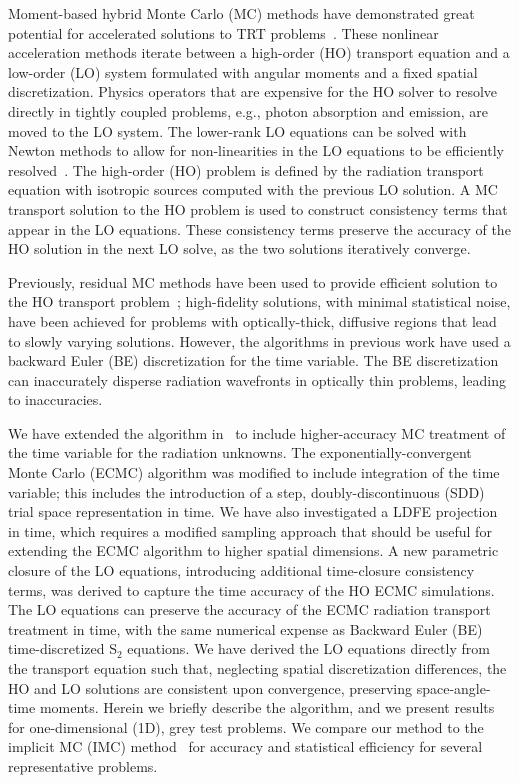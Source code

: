\documentclass{anstrans}
\begin{document}
Moment-based hybrid Monte Carlo (MC)
methods have demonstrated great potential for accelerated
solutions to TRT problems~\cite{rmc,bolding_nse,holo_rh}.   These nonlinear acceleration methods iterate between a
high-order (HO) transport equation and a low-order (LO) system formulated with angular moments
and a fixed spatial discretization.  Physics operators that
are expensive for the HO solver to resolve directly in tightly coupled problems, e.g., photon absorption and emission,
are moved to the LO system. The lower-rank LO equations can be solved with Newton
methods to allow for non-linearities in the LO equations to be efficiently
resolved~\cite{willert,bolding_nse}.  The high-order (HO) problem is defined by the radiation transport equation with
isotropic sources computed with the previous LO solution. A MC transport solution to the HO
problem is used to construct consistency terms that appear in the LO equations. These consistency terms preserve the accuracy of the HO
solution in the next LO solve, as the two solutions iteratively converge.

Previously, residual MC methods have been used to provide efficient
solution to the HO transport problem~\cite{rmc,bolding_nse}; high-fidelity solutions,
with minimal statistical noise, have been achieved for problems with optically-thick, diffusive
regions that lead to slowly varying
solutions.  However, the algorithms in previous work have used a backward
Euler (BE) discretization for the time variable.  The BE discretization can inaccurately disperse radiation
wavefronts in optically thin problems, leading to inaccuracies. 

We have extended the algorithm in~\cite{bolding_nse} to include higher-accuracy MC treatment of the time variable for the
radiation unknowns.  The exponentially-convergent Monte Carlo (ECMC)
algorithm was modified to include integration of the time variable;
this includes the introduction of a step, doubly-discontinuous (SDD) trial space representation
in time.  We have also investigated a LDFE projection in time, which requires a 
modified sampling approach that should be useful for extending the ECMC algorithm to higher spatial
dimensions.  A new
parametric closure of the LO equations, introducing additional time-closure consistency
terms, was derived to capture the time accuracy of the HO
ECMC simulations.  The LO equations can preserve the accuracy of the ECMC radiation transport treatment in
time, with the same numerical expense as Backward Euler (BE) time-discretized S$_2$
equations. We have derived the LO equations directly from the transport equation
such that, neglecting spatial discretization differences,
the HO and LO solutions are consistent upon convergence, preserving space-angle-time moments.
Herein we briefly describe the algorithm, and we present results for
one-dimensional (1D), grey test problems.  We compare our method to the implicit MC
(IMC) method~\cite{fnc} for accuracy and statistical efficiency for several representative problems.
\end{document}
